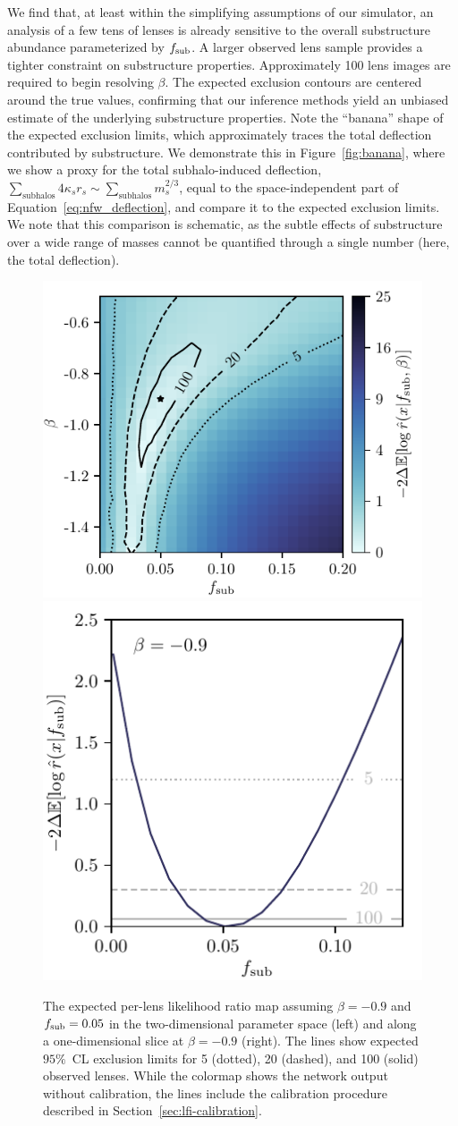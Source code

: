 \documentclass[twocolumn]{aastex63}
\begin{document}
We find that, at least within the simplifying assumptions of our simulator, an analysis of a few tens of lenses is already sensitive to the overall substructure abundance parameterized by $f_{\mathrm{sub}}$. A larger observed lens sample provides a tighter constraint on substructure properties. Approximately 100 lens images are required to begin resolving $\beta$. The expected exclusion contours are centered around the true values, confirming that our inference methods yield an unbiased estimate of the underlying substructure properties. Note the ``banana'' shape of the expected exclusion limits, which approximately traces the total deflection contributed by substructure. We demonstrate this in Figure~\ref{fig:banana}, where we show a proxy for the total subhalo-induced deflection, $\sum_{\text{subhalos}} 4 \kappa_s r_s \sim \sum_{\text{subhalos}} m_s^{2/3}$, equal to the space-independent part of Equation~\eqref{eq:nfw_deflection}, and compare it to the expected exclusion limits. We note that this comparison is schematic, as the subtle effects of substructure over a wide range of masses cannot be quantified through a single number (here, the total deflection).

\begin{figure}[t!]
  \centering
  \includegraphics[height=0.4\textwidth]{figures/expected_likelihood_map}%
  \hspace*{0.075\textwidth}%
  \includegraphics[height=0.4\textwidth]{figures/expected_likelihood_slice}%
  \hspace*{0.052\textwidth}%
  \caption{The expected per-lens likelihood ratio map assuming $\beta = -0.9$ and $f_{\mathrm{sub}} = 0.05$ in the two-dimensional parameter space (left) and along a one-dimensional slice at $\beta = -0.9$ (right). The lines show expected $95\%$~CL exclusion limits for 5 (dotted), 20 (dashed), and 100 (solid) observed lenses. While the colormap shows the network output without calibration, the lines include the calibration procedure described in Section~\ref{sec:lfi-calibration}. }
  \label{fig:expected_likelihood}
\end{figure}
\end{document}
